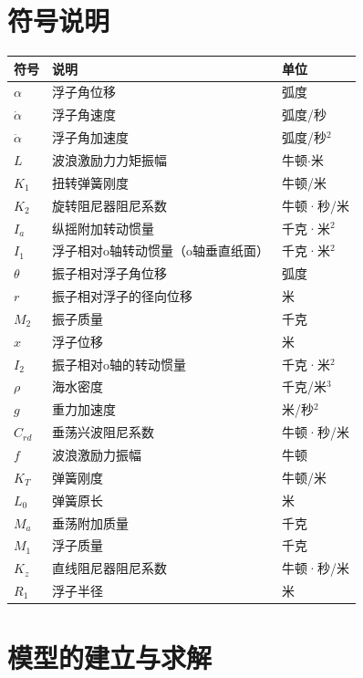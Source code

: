 \documentclass[12pt,utf8]{article}
\begin{document}
\section{符号说明}

\begin{table}[h]
	\centering
	\begin{tabular}{p{2cm}<{\centering}p{8cm}<{\centering}p{3cm}<{\centering}}
		\toprule
		符号 & 说明 & 单位 \\
		\midrule
		$\alpha$ & 浮子角位移  & 弧度   \\
		$\dot{\alpha}$ & 浮子角速度 & 弧度/秒 \\
		$\ddot{\alpha}$ & 浮子角加速度 & 弧度/秒$^2$  \\
		$L$ & 波浪激励力力矩振幅 &  牛顿$\cdot$米 \\
		$K_1$ & 扭转弹簧刚度 & 牛顿/米 \\
		$K_2$ & 旋转阻尼器阻尼系数 & 牛顿·秒/米 \\
		$I_a$ & 纵摇附加转动惯量 & 千克·米$^2$ \\
		$I_1$ & 浮子相对o轴转动惯量（o轴垂直纸面） &  千克·米$^2$ \\
		$\theta$ & 振子相对浮子角位移 & 弧度 \\
		$r$ & 振子相对浮子的径向位移 & 米 \\
		$M_2$ & 振子质量 & 千克\\ 
		$x$ & 浮子位移 & 米 \\
		$I_2$ & 振子相对o轴的转动惯量 & 千克·米$^2$ \\
		$\rho$ & 海水密度 & 千克/米$^3$ \\
		$g$ & 重力加速度 & 米/秒$^2$ \\
		$C_{rd}$ & 垂荡兴波阻尼系数  & 牛顿·秒/米 \\
		$f$ & 波浪激励力振幅 & 牛顿 \\
		$K_T$ & 弹簧刚度 &  牛顿/米 \\
		$L_0$ & 弹簧原长 & 米 \\
		$M_a$ & 垂荡附加质量 & 千克 \\
		$M_1$ & 浮子质量 & 千克 \\
		$K_z$ & 直线阻尼器阻尼系数 & 牛顿·秒/米 \\ 
		$R_1$ & 浮子半径 & 米 \\
		\bottomrule
	\end{tabular}
\end{table}




\section{模型的建立与求解}
\end{document}
